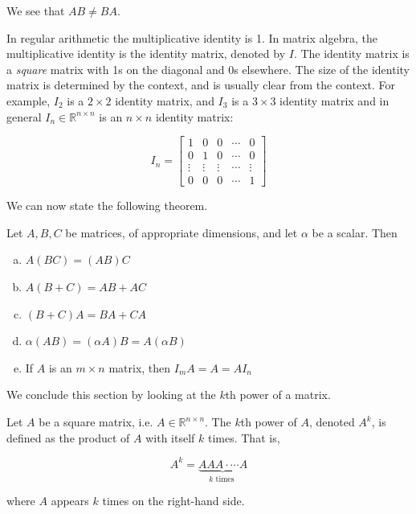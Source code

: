 \begin{solution}
    We see that $AB \neq BA$. \end{solution}

    In regular arithmetic the multiplicative identity is 1. In matrix algebra, the multiplicative identity is the identity matrix, denoted by $I$. The identity matrix is a \textit{square} matrix with 1s on the diagonal and 0s elsewhere. The size of the identity matrix is determined by the context, and is usually clear from the context. For example, $I_2$ is a $2 \times 2$ identity matrix, and $I_3$ is a $3 \times 3$ identity matrix and in general $I_n \in \mathbb{R}^{n \times n}$ is an $n \times n$ identity matrix:

    $$
    I_n=\left[\begin{array}{ccccc}
    1 & 0 & 0 & \cdots & 0 \\
    0 & 1 & 0 & \cdots & 0 \\
    \vdots & \vdots & \vdots & \cdots & \vdots \\
    0 & 0 & 0 & \cdots & 1
    \end{array}\right]
    $$

    We can now state the following theorem.

    \begin{theorem}
        Let $A, B, C$ be matrices, of appropriate dimensions, and let $\alpha$ be a scalar. Then
\begin{enumerate}[(a)]
    \item $A(BC) = (AB)C$
    \item $A(B + C) = AB + AC$
    \item $(B + C)A = BA + CA$
    \item $\alpha(AB) = (\alpha A)B = A(\alpha B)$
    \item If $A$ is an $m\times n$ matrix, then $I_m A=A=AI_n$
\end{enumerate}
\end{theorem}

We conclude this section by looking at the $k$th power of a matrix.

\begin{definition}
    Let $A$ be a square matrix, i.e. $ A \in \mathbb{R}^{n \times n}$. The $k$th power of $A$, denoted $A^k$, is defined as the product of $A$ with itself $k$ times. That is,

    $$
    A^k=\underbrace{ AAA \cdot \cdots A}_{k \text { times }}
    $$

    where $A$ appears $k$ times on the right-hand side.
\end{definition}

